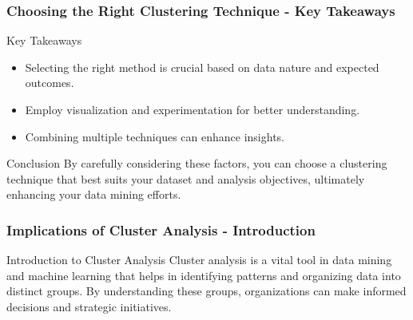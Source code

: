 \documentclass[aspectratio=169]{beamer}
\begin{document}
\begin{frame}[fragile]
    \frametitle{Choosing the Right Clustering Technique - Key Takeaways}
    \begin{block}{Key Takeaways}
        \begin{itemize}
            \item Selecting the right method is crucial based on data nature and expected outcomes.
            \item Employ visualization and experimentation for better understanding.
            \item Combining multiple techniques can enhance insights.
        \end{itemize}
    \end{block}
    
    \begin{block}{Conclusion}
        By carefully considering these factors, you can choose a clustering technique that best suits your dataset and analysis objectives, ultimately enhancing your data mining efforts.
    \end{block}
\end{frame}

\begin{frame}[fragile]
    \frametitle{Implications of Cluster Analysis - Introduction}
    \begin{block}{Introduction to Cluster Analysis}
        Cluster analysis is a vital tool in data mining and machine learning that helps in identifying patterns and organizing data into distinct groups. 
        By understanding these groups, organizations can make informed decisions and strategic initiatives.
    \end{block}
\end{frame}
\end{document}
